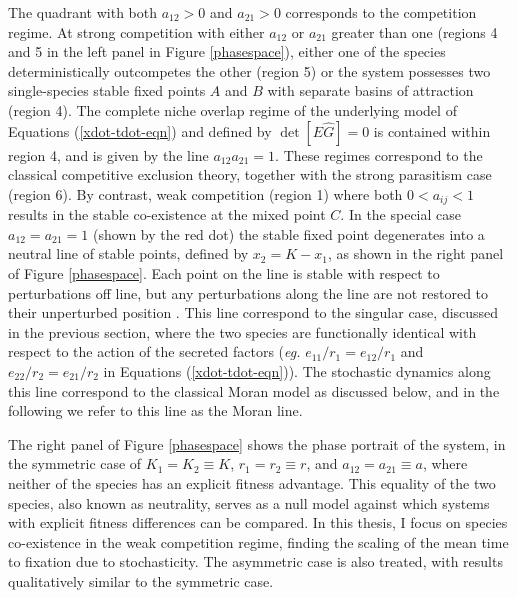 The quadrant with both $a_{12}>0$ and $a_{21}>0$ corresponds to the competition regime. 
At strong competition with either $a_{12}$ or $a_{21}$ greater than one (regions 4 and 5 in the left panel in Figure \ref{phasespace}), either one of the species deterministically outcompetes the other (region 5) or the system possesses two single-species stable fixed points $A$ and $B$ with separate basins of attraction (region 4). 
The complete niche overlap regime of the underlying model of Equations (\ref{xdot-tdot-eqn}) and defined by $\det[\hat{E}\hat{G}]=0$ is contained within region 4, and is given by the line $a_{12}a_{21}=1$. 
These regimes correspond to the classical competitive exclusion theory, together with the strong parasitism case (region 6). %
By contrast, weak competition (region 1) where both $0<a_{ij}<1$ results in the stable co-existence at the mixed point $C$. 
In the special case $a_{12}=a_{21}=1$ (shown by the red dot) the stable fixed point degenerates into a neutral line of stable points, defined by $x_2 = K - x_1$, as shown in the right panel of Figure \ref{phasespace}. 
Each point on the line is stable with respect to perturbations off line, but any perturbations along the line are not restored to their unperturbed position \cite{McGehee1977a,Case1979}. 
This line correspond to the singular case, discussed in the previous section, where the two species are functionally identical with respect to the action of the secreted factors (\emph{eg.} $e_{11}/r_1=e_{12}/r_1$ and $e_{22}/r_2=e_{21}/r_2$ in Equations (\ref{xdot-tdot-eqn})). 
The stochastic dynamics along this line correspond to the classical Moran model as discussed below, and in the following we refer to this line as the Moran line.

The right panel of Figure \ref{phasespace} shows the phase portrait of the system, in the symmetric case of $ K_1 = K_2\equiv K$, $r_1 = r_2\equiv r$, and $a_{12}=a_{21}\equiv a$, where neither of the species has an explicit fitness advantage. 
This equality of the two species, also known as neutrality, serves as a null model against which systems with explicit fitness differences can be compared. 
In this thesis, I focus on species co-existence in the weak competition regime, finding the scaling of the mean time to fixation due to stochasticity. %
The asymmetric case is also treated, with results qualitatively similar to the symmetric case. 



